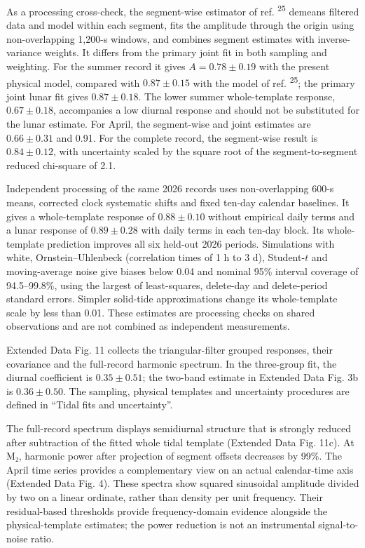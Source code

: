 \documentclass[
  11pt,
  a4paper,
]{article}
\begin{document}
As a processing cross-check, the segment-wise estimator of ref.
\textsuperscript{25} demeans filtered data and model within each
segment, fits the amplitude through the origin using non-overlapping
1,200-s windows, and combines segment estimates with inverse-variance
weights. It differs from the primary joint fit in both sampling and
weighting. For the summer record it gives \(A=0.78\pm0.19\) with the
present physical model, compared with \(0.87\pm0.15\) with the model of
ref. \textsuperscript{25}; the primary joint lunar fit gives
\(0.87\pm0.18\). The lower summer whole-template response,
\(0.67\pm0.18\), accompanies a low diurnal response and should not be
substituted for the lunar estimate. For April, the segment-wise and
joint estimates are \(0.66\pm0.31\) and 0.91. For the complete record,
the segment-wise result is \(0.84\pm0.12\), with uncertainty scaled by
the square root of the segment-to-segment reduced chi-square of 2.1.

Independent processing of the same 2026 records uses non-overlapping
600-s means, corrected clock systematic shifts and fixed ten-day
calendar baselines. It gives a whole-template response of
\(0.88\pm0.10\) without empirical daily terms and a lunar response of
\(0.89\pm0.28\) with daily terms in each ten-day block. Its
whole-template prediction improves all six held-out 2026 periods.
Simulations with white, Ornstein--Uhlenbeck (correlation times of 1 h to
3 d), Student-\(t\) and moving-average noise give biases below 0.04 and
nominal 95\% interval coverage of 94.5--99.8\%, using the largest of
least-squares, delete-day and delete-period standard errors. Simpler
solid-tide approximations change its whole-template scale by less than
0.01. These estimates are processing checks on shared observations and
are not combined as independent measurements.

Extended Data Fig. 11 collects the triangular-filter grouped responses,
their covariance and the full-record harmonic spectrum. In the
three-group fit, the diurnal coefficient is \(0.35\pm0.51\); the
two-band estimate in Extended Data Fig. 3b is \(0.36\pm0.50\). The
sampling, physical templates and uncertainty procedures are defined in
``Tidal fits and uncertainty''.

The full-record spectrum displays semidiurnal structure that is strongly
reduced after subtraction of the fitted whole tidal template (Extended
Data Fig. 11c). At M₂, harmonic power after projection of segment
offsets decreases by 99\%. The April time series provides a
complementary view on an actual calendar-time axis (Extended Data Fig.
4). These spectra show squared sinusoidal amplitude divided by two on a
linear ordinate, rather than density per unit frequency. Their
residual-based thresholds provide frequency-domain evidence alongside
the physical-template estimates; the power reduction is not an
instrumental signal-to-noise ratio.
\end{document}
